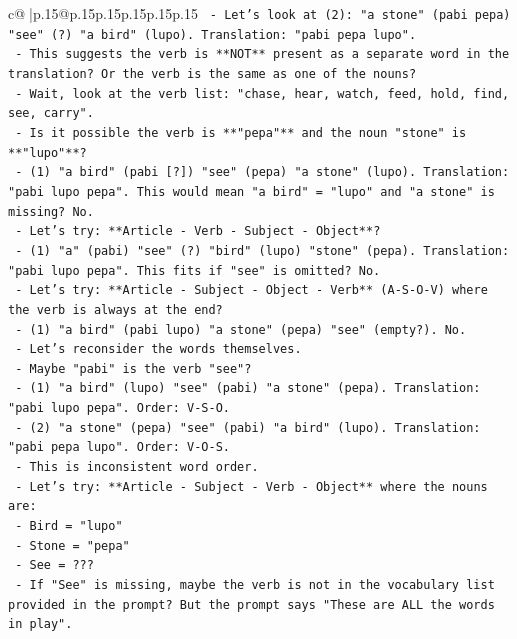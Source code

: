 \documentclass{article}
\begin{document}
{\begin{supertabular}{c@{$\;$}|p{.15\linewidth}@{}p{.15\linewidth}p{.15\linewidth}p{.15\linewidth}p{.15\linewidth}p{.15\linewidth}}
{{{\texttt{    {-} Let's look at (2): "a stone" (pabi pepa) "see" (?) "a bird" (lupo). Translation: "pabi pepa lupo".} \\
\texttt{    {-} This suggests the verb is **NOT** present as a separate word in the translation? Or the verb is the same as one of the nouns?} \\
\texttt{    {-} Wait, look at the verb list: "chase, hear, watch, feed, hold, find, see, carry".} \\
\texttt{    {-} Is it possible the verb is **"pepa"** and the noun "stone" is **"lupo"**?} \\
\texttt{      {-} (1) "a bird" (pabi {[}?{]}) "see" (pepa) "a stone" (lupo). Translation: "pabi lupo pepa". This would mean "a bird" = "lupo" and "a stone" is missing? No.} \\
\texttt{    {-} Let's try: **Article {-} Verb {-} Subject {-} Object**?} \\
\texttt{      {-} (1) "a" (pabi) "see" (?) "bird" (lupo) "stone" (pepa). Translation: "pabi lupo pepa". This fits if "see" is omitted? No.} \\
\texttt{    {-} Let's try: **Article {-} Subject {-} Object {-} Verb** (A{-}S{-}O{-}V) where the verb is always at the end?} \\
\texttt{      {-} (1) "a bird" (pabi lupo) "a stone" (pepa) "see" (empty?). No.} \\
\texttt{    {-} Let's reconsider the words themselves.} \\
\texttt{      {-} Maybe "pabi" is the verb "see"?} \\
\texttt{        {-} (1) "a bird" (lupo) "see" (pabi) "a stone" (pepa). Translation: "pabi lupo pepa". Order: V{-}S{-}O.} \\
\texttt{        {-} (2) "a stone" (pepa) "see" (pabi) "a bird" (lupo). Translation: "pabi pepa lupo". Order: V{-}O{-}S.} \\
\texttt{        {-} This is inconsistent word order.} \\
\texttt{    {-} Let's try: **Article {-} Subject {-} Verb {-} Object** where the nouns are:} \\
\texttt{      {-} Bird = "lupo"} \\
\texttt{      {-} Stone = "pepa"} \\
\texttt{      {-} See = ???} \\
\texttt{      {-} If "See" is missing, maybe the verb is not in the vocabulary list provided in the prompt? But the prompt says "These are ALL the words in play".} \\
}}}
\end{supertabular}}
\end{document}
